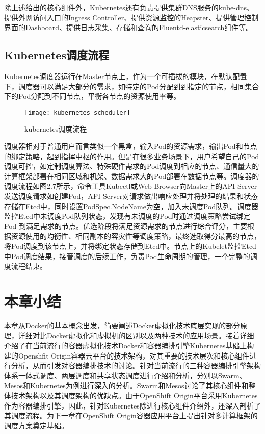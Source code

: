 除上述给出的核心组件外，Kubernetes还有负责提供集群DNS服务的kube-dns、提供外网访问入口的Ingress Controller、提供资源监控的Heapster、提供管理控制界面的Dashboard、提供日志采集、存储和查询的Fluentd-elasticsearch组件等。

\subsection{Kubernetes调度流程}
Kubernetes调度器运行在Master节点上，作为一个可插拔的模块，在默认配置下，调度器可以满足大部分的需求，如特定的Pod分配到到指定的节点，相同集合下的Pod分配到不同节点，平衡各节点的资源使用率等。
\begin{figure}[H] %
	\centering
	\texttt{[image: kubernetes-scheduler]}
	\caption{kubernetes调度流程}
\end{figure}
调度器相对于普通用户而言类似一个黑盒，输入Pod的资源需求，输出Pod和节点的绑定策略，起到指挥中枢的作用。但是在很多业务场景下，用户希望自己的Pod调度可控，如定制调度算法、特殊硬件需求的Pod调度到相应的节点、通信量大的计算框架部署在相同区域和机架、数据需求大的Pod部署在数据节点等。调度器的调度流程如图2.7所示，命令工具Kubectl或Web Browser向Master上的API Server发送调度请求如创建Pod，API Server对请求做出响应处理并将处理的结果和状态存储在Etcd中，同时设置PodSpec.NodeName为空，加入未调度Pod队列。调度器监控Etcd中未调度Pod队列状态，发现有未调度的Pod时通过调度策略尝试绑定Pod 到满足需求的节点。优选阶段将满足资源需求的节点进行综合评分，主要根据资源使用的均衡性、相同副本的容灾性等调度策略，最终选取得分最高的节点，将Pod调度到该节点上，并将绑定状态存储到Etcd中。节点上的Kubelet监控Etcd中Pod调度结果，接管调度的后续工作，负责Pod生命周期的管理，一个完整的调度流程结束。

\section{本章小结}
本章从Docker的基本概念出发，简要阐述Docker虚拟化技术底层实现的部分原理，详细对比Docker虚拟化和虚拟机的区别以及两种技术的应用场景。接着详细介绍了在当前流行的容器虚拟化技术Docker和容器编排引擎Kubernetes基础上构建的Openshfit Origin容器云平台的技术架构，对其重要的技术层次和核心组件进行分析，从而引发对容器编排技术的讨论。针对当前流行的三种容器编排引擎架构体系一体式调度、两层调度和共享状态调度进行介绍和分析，分别以Swarm、Mesos和Kubernetes为例进行深入的分析。Swarm和Mesos讨论了其核心组件和整体技术架构以及其调度架构的优缺点。由于OpenShift Origin平台采用Kubernetes作为容器编排引擎，因此，针对Kubernetes除进行核心组件介绍外，还深入剖析了其调度流程。为下一章在OpenShift Origin容器应用平台上提出针对多计算框架的调度方案奠定基础。




